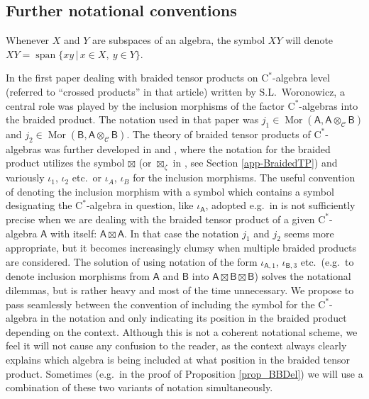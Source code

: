 \documentclass[12pt,reqno,a4paper]{amsart}
\theoremstyle{definition}
\newcommand{\cst}{\ensuremath{\mathrm{C}^*}}
\newcommand{\tens}{\otimes}
\newcommand{\sA}{\mathsf{A}}
\newcommand{\sB}{\mathsf{B}}
\DeclareMathOperator{\Mor}{Mor}
\numberwithin{equation}{section}
\begin{document}
\subsection{Further notational conventions}\label{sect-notation}
Whenever $X$ and $Y$ are subspaces of an algebra, the symbol $XY$ will denote $XY=\operatorname{span}\{xy\,|\,x\in X,\:y\in Y\}$.

In the first paper \cite{ExampleBraided} dealing with braided tensor products on \cst-algebra level (referred to ``crossed products'' in that article) written by S.L.~Woronowicz, a central role was played by the inclusion morphisms of the factor \cst-algebras into the braided product. The notation used in that paper was $j_1\in\Mor(\sA,\sA\tens_{\scriptscriptstyle\mathcal{C}}\!\sB)$ and $j_2\in\Mor(\sB,\sA\tens_{\scriptscriptstyle\mathcal{C}}\!\sB)$. The theory of braided tensor products of \cst-algebras was further developed in \cite{BraidedSU2,MeyerRoyWoronowiczI,MeyerRoyWoronowiczII} and \cite{DeCommerKrajczok}, where the notation for the braided product utilizes the symbol $\boxtimes$ (or $\boxtimes_\zeta$ in \cite{BraidedSU2}, see Section \ref{app-BraidedTP}) and variously $\iota_1$, $\iota_2$ etc.~or $\iota_A$, $\iota_B$ for the inclusion morphisms. The useful convention of denoting the inclusion morphism with a symbol which contains a symbol designating the \cst-algebra in question, like $\iota_\sA$, adopted e.g.~in \cite{MeyerRoyWoronowiczI,MeyerRoyWoronowiczII,DeCommerKrajczok} is not sufficiently precise when we are dealing with the braided tensor product of a given \cst-algebra $\sA$ with itself: $\sA\boxtimes\sA$. In that case the notation $j_1$ and $j_2$ seems more appropriate, but it becomes increasingly clumsy when multiple braided products are considered. The solution of using notation of the form $\iota_{\sA,1}$, $\iota_{\sB,3}$ etc.~(e.g.~to denote inclusion morphisms from $\sA$ and $\sB$ into $\sA\boxtimes\sB\boxtimes\sB$) solves the notational dilemmas, but is rather heavy and most of the time unnecessary. We propose to pass seamlessly between the convention of including the symbol for the \cst-algebra in the notation and only indicating its position in the braided product depending on the context. Although this is not a coherent notational scheme, we feel it will not cause any confusion to the reader, as the context always clearly explains which algebra is being included at what position in the braided tensor product. Sometimes (e.g.~in the proof of Proposition \ref{prop_BBDel}) we will use a combination of these two variants of notation simultaneously.
\end{document}
